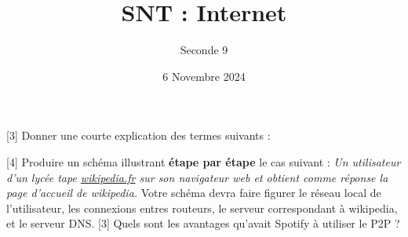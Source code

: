 \documentclass{exam}
\title{SNT : Internet}
\date{6 Novembre 2024}
\author{Seconde 9}
\begin{document}
\maketitle

\begin{questions}
[3]
Donner une courte explication des termes suivants :
[4]
Produire un schéma illustrant \textbf{étape par étape} le cas suivant : \emph{Un utilisateur d'un lycée tape \url{wikipedia.fr} sur son navigateur web et obtient comme réponse la page d'accueil de wikipedia.} Votre schéma devra faire figurer le réseau local de l'utilisateur, les connexions entres routeurs, le serveur correspondant à wikipedia, et le serveur DNS. 
[3]
Quels sont les avantages qu'avait Spotify à utiliser le P2P ?
\end{questions}
\end{document}
